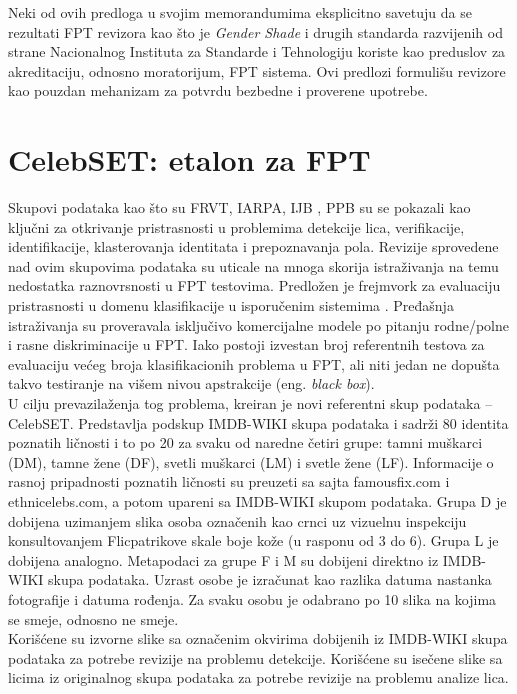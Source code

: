 \documentclass[11pt, a4paper]{article}
\begin{document}
Neki od ovih predloga u svojim memorandumima eksplicitno savetuju da se rezultati FPT revizora kao što je \textit{Gender Shade} \cite{G6} i drugih standarda razvijenih od strane Nacionalnog Instituta za Standarde i Tehnologiju koriste kao preduslov za akreditaciju, odnosno moratorijum, FPT sistema. Ovi predlozi formulišu revizore kao pouzdan mehanizam za potvrdu bezbedne i proverene upotrebe.


\section{CelebSET: etalon za FPT}
Skupovi podataka kao što su FRVT, IARPA, IJB \cite{G38}, PPB \cite{G6} su se pokazali kao ključni za otkrivanje pristrasnosti u problemima detekcije lica, verifikacije, identifikacije, klasterovanja identitata i prepoznavanja pola. Revizije sprovedene nad ovim skupovima podataka su uticale na mnoga skorija istraživanja na temu nedostatka raznovrsnosti u FPT testovima. Predložen je frejmvork za evaluaciju pristrasnosti u domenu klasifikacije u isporučenim sistemima \cite{G32, G43, G45}. Pređašnja istraživanja su proveravala isključivo komercijalne modele po pitanju rodne/polne i rasne diskriminacije u FPT. Iako postoji izvestan broj referentnih testova za evaluaciju većeg broja klasifikacionih problema u FPT, ali niti jedan ne dopušta takvo testiranje na višem nivou apstrakcije (eng. \textit{black box}). \\
\indent U cilju prevazilaženja tog problema, kreiran je novi referentni skup podataka -- CelebSET. Predstavlja podskup IMDB-WIKI skupa podataka \cite{G40} i sadrži 80 identita poznatih ličnosti i to po 20 za svaku od naredne četiri grupe: tamni muškarci (DM), tamne žene (DF), svetli muškarci (LM) i svetle žene (LF). Informacije o rasnoj pripadnosti poznatih ličnosti su preuzeti sa sajta famousfix.com i ethnicelebs.com, a potom upareni sa IMDB-WIKI skupom podataka. Grupa D je dobijena uzimanjem slika osoba označenih kao crnci uz vizuelnu inspekciju konsultovanjem Flicpatrikove skale boje kože \cite{G41} (u rasponu od 3 do 6). Grupa L je dobijena analogno. Metapodaci za grupe F i M su dobijeni direktno iz IMDB-WIKI skupa podataka. Uzrast osobe je izračunat kao razlika datuma nastanka fotografije i datuma rođenja. Za svaku osobu je odabrano po 10 slika na kojima se smeje, odnosno ne smeje. \\
\indent Korišćene su izvorne slike sa označenim okvirima dobijenih iz IMDB-WIKI skupa podataka \cite{G40} za potrebe revizije na problemu detekcije. Korišćene su isečene slike sa licima iz originalnog skupa podataka za potrebe revizije na problemu analize lica.
\end{document}
